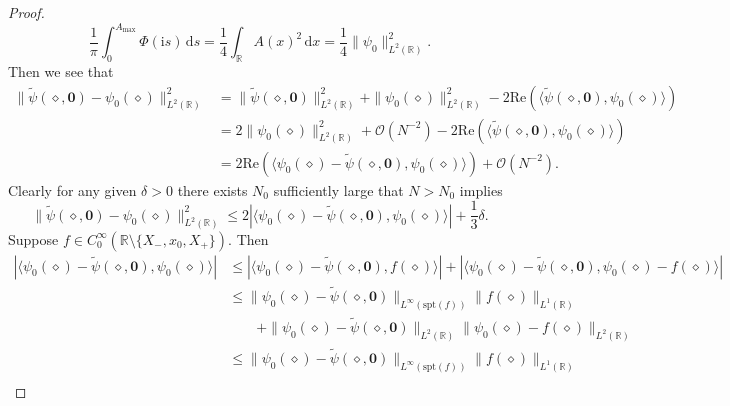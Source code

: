 \documentclass[12pt]{amsart}
\numberwithin{equation}{section}
\newcommand{\dd}{\mathrm{d}}
\newcommand{\ii}{\mathrm{i}}
\newcommand{\phaseint}{\Phi}
\begin{document}
\begin{proof}
\begin{equation}
\frac{1}{\pi}\int_0^{A_\mathrm{max}}\phaseint(\ii s)\,\dd s = \frac{1}{4}\int_{\mathbb{R}}A(x)^2\,\dd x = \frac{1}{4}\|\psi_0\|_{L^2(\mathbb{R})}^2.
\end{equation}
Then we see that
\begin{equation}
\begin{split}
\|\widetilde{\psi}(\diamond,\mathbf{0})-\psi_0(\diamond)\|_{L^2(\mathbb{R})}^2 &= \|\widetilde{\psi}(\diamond,\mathbf{0})\|_{L^2(\mathbb{R})}^2 + \|\psi_0(\diamond)\|_{L^2(\mathbb{R})}^2 -2\mathrm{Re}\left(\langle \widetilde{\psi}(\diamond,\mathbf{0}),\psi_0(\diamond)\rangle\right)\\
&=2\|\psi_0(\diamond)\|_{L^2(\mathbb{R})}^2 + \mathcal{O}(N^{-2}) -2\mathrm{Re}\left(\langle \widetilde{\psi}(\diamond,\mathbf{0}),\psi_0(\diamond)\rangle\right)\\
&=2\mathrm{Re}\left(\langle\psi_0(\diamond)-\widetilde{\psi}(\diamond,\mathbf{0}),\psi_0(\diamond)\rangle\right) + \mathcal{O}(N^{-2}).
\end{split}
\end{equation}
Clearly for any given $\delta>0$ there exists $N_0$ sufficiently large that $N>N_0$ implies
\begin{equation}
\|\widetilde{\psi}(\diamond,\mathbf{0})-\psi_0(\diamond)\|_{L^2(\mathbb{R})}^2\le 2\left|\langle\psi_0(\diamond)-\widetilde{\psi}(\diamond,\mathbf{0}),\psi_0(\diamond)\rangle\right| + \frac{1}{3}\delta.
\end{equation}
Suppose $f\in C_0^\infty(\mathbb{R}\setminus\{X_-,x_0,X_+\})$. Then 
\begin{equation}
\begin{split}
\left|\langle\psi_0(\diamond)-\widetilde{\psi}(\diamond,\mathbf{0}),\psi_0(\diamond)\rangle\right|&\le
\left|\langle\psi_0(\diamond)-\widetilde{\psi}(\diamond,\mathbf{0}),f(\diamond)\rangle\right| + \left|\langle\psi_0(\diamond)-\widetilde{\psi}(\diamond,\mathbf{0}),\psi_0(\diamond)-f(\diamond)\rangle\right|\\ &\le \|\psi_0(\diamond)-\widetilde{\psi}(\diamond,\mathbf{0})\|_{L^\infty(\mathrm{spt}(f))}\|f(\diamond)\|_{L^1(\mathbb{R})} \\
&\qquad{}+ \|\psi_0(\diamond)-\widetilde{\psi}(\diamond,\mathbf{0})\|_{L^2(\mathbb{R})}\|\psi_0(\diamond)-f(\diamond)\|_{L^2(\mathbb{R})}\\
&\le \|\psi_0(\diamond)-\widetilde{\psi}(\diamond,\mathbf{0})\|_{L^\infty(\mathrm{spt}(f))}\|f(\diamond)\|_{L^1(\mathbb{R})} \\

\end{split}
\end{equation}
\end{proof}
\end{document}
